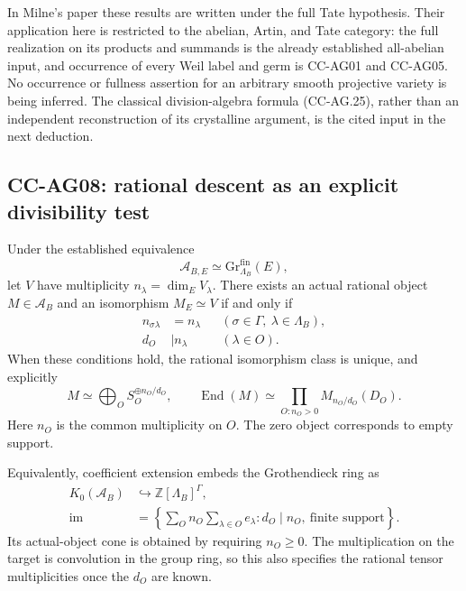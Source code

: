 \documentclass[11pt,a4paper]{article}
\theoremstyle{definition}\newtheorem{definition}[theorem]{Definition}
\theoremstyle{remark}\newtheorem{remark}[theorem]{Remark}
\begin{document}
In Milne's paper these results are written under the full Tate
hypothesis.  Their application here is restricted to the
abelian, Artin, and Tate category: the full realization on its
products and summands is the already established all-abelian
input, and occurrence of every Weil label and germ is
CC-AG01 and CC-AG05.  No occurrence or fullness assertion for
an arbitrary smooth projective variety is being inferred.
The classical division-algebra formula (CC-AG.25), rather
than an independent reconstruction of its crystalline
argument, is the cited input in the next deduction.

\subsection{CC-AG08: rational descent as an explicit divisibility test}

Under the established equivalence
\[
       \mathcal A_{B,E}\simeq
                    \mathrm{Gr}^{\mathrm{fin}}_{\Lambda_B}(E),
                                                               \tag{CC-AG.28}
\]
let \(V\) have multiplicity
\(n_\lambda=\dim_E V_\lambda\).
There exists an actual rational object \(M\in\mathcal A_B\)
and an isomorphism \(M_E\simeq V\) if and only if
\[
 \begin{aligned}
 n_{\sigma\lambda}&=n_\lambda
                 &&(\sigma\in\Gamma,\ \lambda\in\Lambda_B),\\
 d_O&\mid n_\lambda
                 &&(\lambda\in O).
 \end{aligned}                                                \tag{CC-AG.29}
\]
When these conditions hold, the rational isomorphism class is
unique, and explicitly
\[
       M\simeq\bigoplus_O S_O^{\oplus n_O/d_O},\qquad
       \operatorname{End}(M)
          \simeq\prod_{O:n_O>0}M_{n_O/d_O}(D_O).               \tag{CC-AG.30}
\]
Here \(n_O\) is the common multiplicity on \(O\).
The zero object corresponds to empty support.

Equivalently, coefficient extension embeds the Grothendieck
ring as
\[
 \begin{split}
 K_0(\mathcal A_B)&\hookrightarrow
                         \mathbb Z[\Lambda_B]^\Gamma,\\
 \operatorname{im}&=
     \left\{\sum_O n_O\!\sum_{\lambda\in O}e_\lambda:
                   d_O\mid n_O,\ \text{finite support}\right\}.
 \end{split}                                                \tag{CC-AG.31}
\]
Its actual-object cone is obtained by requiring \(n_O\ge0\).
The multiplication on the target is convolution in the
group ring, so this also specifies the rational tensor
multiplicities once the \(d_O\) are known.
\end{document}
